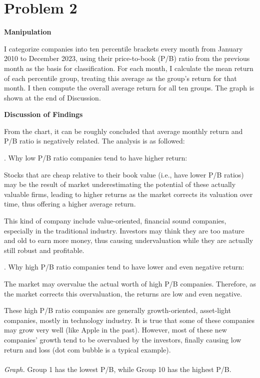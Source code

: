 
\noindent
\section*{Problem 2}

\noindent
\textbf{Manipulation}

I categorize companies into ten percentile brackets every month from January 2010 to December 2023, using their price-to-book (P/B) ratio from the previous month as the basis for classification. For each month, I calculate the mean return of each percentile group, treating this average as the group's return for that month. I then compute the overall average return for all ten groups. The graph is shown at the end of Discussion.


\noindent
\textbf{Discussion of Findings}

From the chart, it can be roughly concluded that average monthly return and P/B ratio is negatively related. The analysis is as followed:

. Why low P/B ratio companies tend to have higher return: 

Stocks that are cheap relative to their book value (i.e., have lower P/B ratios) may be the result of market underestimating the potential of these actually valuable firms, leading to higher returns as the market corrects its valuation over time, thus offering a higher average return. 

This kind of company include value-oriented, financial sound companies, especially in the traditional industry. Investors may think they are too mature and old to earn more money, thus causing undervaluation while they are actually still robust and profitable.

. Why high P/B ratio companies tend to have lower and even negative return: 

The market may overvalue the actual worth of high P/B companies. Therefore, as the market corrects this overvaluation, the returns are low and even negative.

These high P/B ratio companies are generally growth-oriented, asset-light companies, mostly in technology industry. It is true that some of these companies may grow very well (like Apple in the past). However, most of these new companies' growth tend to be overvalued by the investors, finally causing low return and loss (dot com bubble is a typical example).\\

\\
\noindent
\textit{Graph.} Group 1 has the lowest P/B, while Group 10 has the highest P/B.


